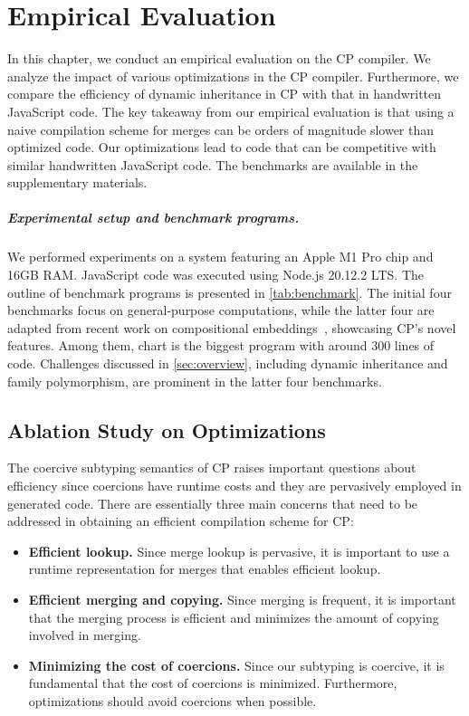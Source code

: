 \chapter{Empirical Evaluation} \label{ch:empirical}

In this chapter, we conduct an empirical evaluation on the CP compiler. We
analyze the impact of various optimizations in the CP compiler. Furthermore, we
compare the efficiency of dynamic inheritance in CP with that in handwritten
JavaScript code. The key takeaway from our empirical evaluation is that using a
naive compilation scheme for merges can be orders of magnitude slower than
optimized code. Our optimizations lead to code that can be competitive with
similar handwritten JavaScript code. The benchmarks are available in the
supplementary materials.

\paragraph{Experimental setup and benchmark programs.}
We performed experiments on a system featuring an Apple M1 Pro chip and 16GB
RAM. JavaScript code was executed using Node.js 20.12.2 LTS. The outline of
benchmark programs is presented in \autoref{tab:benchmark}. The initial four
benchmarks focus on general-purpose computations, while the latter four are
adapted from recent work on compositional
embeddings~\citep{sun2022compositional}, showcasing CP's novel features. Among
them, \textsf{chart} is the biggest program with around 300 lines of code.
Challenges discussed in \autoref{sec:overview}, including dynamic inheritance
and family polymorphism, are prominent in the latter four benchmarks.

\section{Ablation Study on Optimizations} \label{sec:optimization}

The coercive subtyping semantics of CP raises important questions about
efficiency since coercions have runtime costs and they are pervasively employed
in generated code. There are essentially three main concerns that need to be
addressed in obtaining an efficient compilation scheme for CP:

\begin{itemize}

\item \textbf{Efficient lookup.} Since merge lookup is pervasive, it is
      important to use a runtime representation for merges that enables
      efficient lookup.

\item \textbf{Efficient merging and copying.} Since merging is frequent, it is
      important that the merging process is efficient and minimizes the amount
      of copying involved in merging.

\item \textbf{Minimizing the cost of coercions.} Since our subtyping is
      coercive, it is fundamental that the cost of coercions is minimized.
      Furthermore, optimizations should avoid coercions when possible.
  
\end{itemize}

